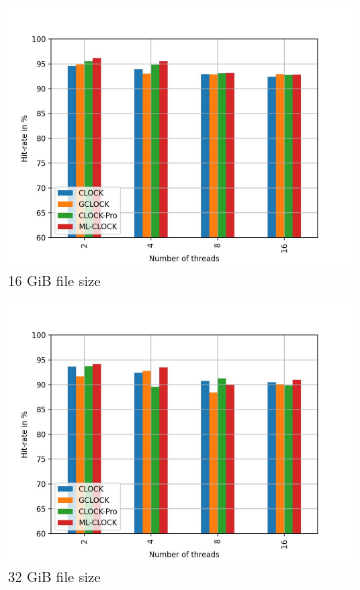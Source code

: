\documentclass[
	12pt,
	a4paper,
	abstract,
	bibliography=totoc,
	chapterprefix,
	headings=openright,
	numbers=endperiod,
	parskip=half,
	twoside,
]{scrreprt}
\begin{document}
\begin{figure}[H]
	\centering
	\begin{subfigure}{0.4\textwidth}
		\includegraphics[width=\textwidth]{multi_16_gb_rw_50to50_zipf.jpg}		
		\caption{16 GiB file size}
		\label{fig:rw_90to10  zipf}
	\end{subfigure}
	\hfill
	\begin{subfigure}{0.4\textwidth}
		\includegraphics[width=\textwidth]{multi_32_gb_rw_50to50_zipf.jpg}		
		\caption{32 GiB file size}
		\label{fig:rw_90to10  normal}
	\end{subfigure}
	\hfill
	\begin{subfigure}{0.4\textwidth}

\end{subfigure}
\end{figure}
\end{document}

